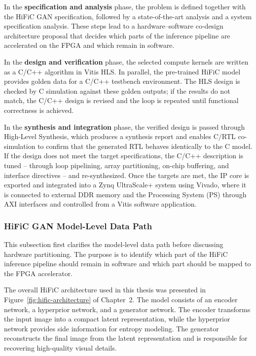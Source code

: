 In the \textbf{specification and analysis} phase, the problem is defined together with the HiFiC GAN specification, followed by a state-of-the-art analysis and a system specification analysis. These steps lead to a hardware--software co-design architecture proposal that decides which parts of the inference pipeline are accelerated on the FPGA and which remain in software.

In the \textbf{design and verification} phase, the selected compute kernels are written as a C/C++ algorithm in Vitis HLS. In parallel, the pre-trained HiFiC model provides golden data for a C/C++ testbench environment. The HLS design is checked by C simulation against these golden outputs; if the results do not match, the C/C++ design is revised and the loop is repeated until functional correctness is achieved.

In the \textbf{synthesis and integration} phase, the verified design is passed through High-Level Synthesis, which produces a synthesis report and enables C/RTL co-simulation to confirm that the generated RTL behaves identically to the C model. If the design does not meet the target specifications, the C/C++ description is tuned -- through loop pipelining, array partitioning, on-chip buffering, and interface directives -- and re-synthesized. Once the targets are met, the IP core is exported and integrated into a Zynq UltraScale+ system using Vivado, where it is connected to external DDR memory and the Processing System (PS) through AXI interfaces and controlled from a Vitis software application.

\subsubsection{HiFiC GAN Model-Level Data Path}

This subsection first clarifies the model-level data path before discussing hardware partitioning. The purpose is to identify which part of the HiFiC inference pipeline should remain in software and which part should be mapped to the FPGA accelerator.

The overall HiFiC architecture used in this thesis was presented in Figure~\ref{fig:hific-architecture} of Chapter~2. The model consists of an encoder network, a hyperprior network, and a generator network. The encoder transforms the input image into a compact latent representation, while the hyperprior network provides side information for entropy modeling. The generator reconstructs the final image from the latent representation and is responsible for recovering high-quality visual details.

